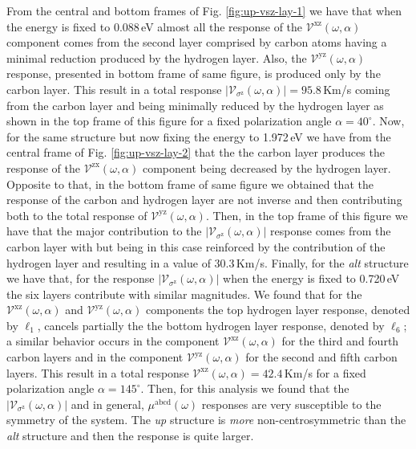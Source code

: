 \documentclass[prb,11pt,tightenlines,twocolumn,aps]{revtex4-1}
\begin{document}
From the central and bottom frames of Fig. \ref{fig:up-vsz-lay-1} we have that
when the energy is fixed to 0.088\,eV almost all the response of the
$\mathcal{V}^{\mathrm{xz}}(\omega,\alpha)$ component comes from the second
layer comprised by carbon atoms having a minimal reduction produced by the
hydrogen layer.
% 
Also, the $\mathcal{V}^{\mathrm{yz}}(\omega,\alpha)$ response, presented in
bottom frame of same figure, is produced only by the carbon layer. This result
in a total response $|\mathcal{V}_{\sigma^{\mathrm{z}}}(\omega,\alpha)| =
95.8$\,Km/s coming from the carbon layer and being minimally reduced by the
hydrogen layer as shown in the top frame of this figure for a fixed
polarization angle $\alpha = 40^{\circ}$.
% 
Now, for the same structure but now fixing the energy to 1.972\,eV we have from
the central frame of Fig. \ref{fig:up-vsz-lay-2} that the the carbon layer
produces the response of the $\mathcal{V}^{\mathrm{zx}}(\omega,\alpha)$
component being decreased by the hydrogen layer. Opposite to that, in the
bottom frame of same figure we obtained that the response of the carbon and
hydrogen layer are not inverse and then contributing both to the total response
of $\mathcal{V}^{\mathrm{yz}}(\omega,\alpha)$. Then, in the top frame of this
figure we have that the major contribution to the
$|\mathcal{V}_{\sigma^{\mathrm{z}}}(\omega,\alpha)|$ response comes from the
carbon layer with but being in this case reinforced by the contribution of the
hydrogen layer and resulting in a value of 30.3\,Km/s.
Finally, for the \emph{alt} structure we have that, for the response $|
\mathcal{V}_{\sigma^{\mathrm{z}}} (\omega,\alpha)|$ when the energy is fixed to
0.720\,eV the six layers contribute with similar magnitudes. 
% 
We found that for the $\mathcal{V}^{\mathrm{xz}} (\omega,\alpha)$ and
$\mathcal{V}^{\mathrm{yz}} (\omega,\alpha)$ components the top hydrogen layer
response, denoted by $\ell_{1}$, cancels partially the the bottom hydrogen
layer response, denoted by $\ell_{6}$;
% 
a similar behavior occurs in the component $\mathcal{V}^{\mathrm{xz}}
(\omega,\alpha)$ for the third and fourth carbon layers and in the component
$\mathcal{V}^{\mathrm{yz}} (\omega,\alpha)$ for the second and fifth carbon
layers.
% 
This result in a total response $\mathcal{V}^{\mathrm{xz}}(\omega,\alpha) =
42.4$\,Km/s for a fixed polarization angle $\alpha = 145^{\circ}$.
% 
Then, for this analysis we found that the $|\mathcal{V}_{\sigma^{\mathrm{z}}} 
(\omega,\alpha)|$ and in general, $\mu^{\mathrm{abcd}} (\omega)$ responses are
very susceptible to the symmetry of the system. The \emph{up} structure is 
\emph{more} non-centrosymmetric than the \emph{alt} structure and then the
response is quite larger.
\end{document}
